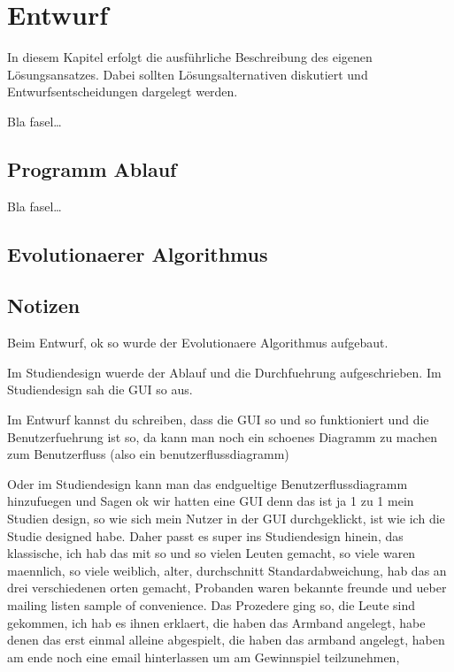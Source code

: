 
\chapter{Entwurf}
\label{ch:Entwurf}
In diesem Kapitel erfolgt die ausführliche Beschreibung des eigenen
Lösungsansatzes. Dabei sollten Lösungsalternativen diskutiert und
Entwurfsentscheidungen dargelegt werden.


Bla fasel\ldots

\section{Programm Ablauf}
\label{ch:Entwurf:sec:Programm Ablauf}

Bla fasel\ldots



\section{Evolutionaerer Algorithmus}
\label{ch:Entwurf:sec:Evolutionaerer Algorithmus}




\section{Notizen}
\label{ch:Entwurf:sec:Notizen}

Beim Entwurf, ok so wurde der Evolutionaere Algorithmus aufgebaut.

Im Studiendesign wuerde der Ablauf und die Durchfuehrung aufgeschrieben.
Im Studiendesign sah die GUI so aus. 

Im Entwurf kannst du schreiben, dass die GUI so und so funktioniert und die Benutzerfuehrung ist so, da kann man noch ein schoenes Diagramm zu machen zum Benutzerfluss (also ein benutzerflussdiagramm) 

Oder im Studiendesign kann man das endgueltige Benutzerflussdiagramm hinzufuegen und Sagen ok wir hatten eine GUI denn das ist ja 1 zu 1 mein Studien design, so wie sich mein Nutzer in der GUI durchgeklickt, ist wie ich die Studie designed habe. Daher passt es super ins Studiendesign hinein, das klassische, ich hab das mit so und so vielen Leuten gemacht, so viele waren maennlich, so viele weiblich, alter, durchschnitt Standardabweichung, hab das an drei verschiedenen orten gemacht, Probanden waren bekannte freunde und ueber mailing listen sample of convenience. Das Prozedere ging so, die Leute sind gekommen, ich hab es ihnen erklaert, die haben das Armband angelegt, habe denen das erst einmal alleine abgespielt, die haben das armband angelegt, haben am ende noch eine email hinterlassen um am Gewinnspiel teilzunehmen,

